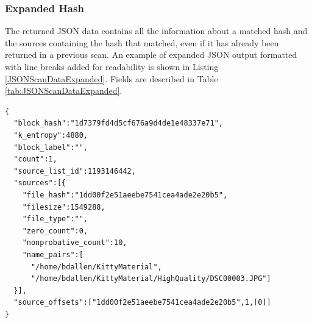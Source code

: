 \documentclass[11pt,fleqn]{article} %
\begin{document}
\subsubsection{Expanded Hash}
The returned JSON data contains all the information about a matched hash and the sources containing the hash that matched, even if it has already been returned in a previous scan. An example of expanded JSON output formatted with line breaks added for readability is shown in Listing \ref{JSONScanDataExpanded}. Fields are described in Table \ref{tab:JSONScanDataExpanded}.\\

\lstset{style=customfile}
\begin{lstlisting}[float, caption={Example JSON block hash expanded data output from a scan match, with line breaks added for readability}, label=JSONScanDataExpanded]
{
  "block_hash":"1d7379fd4d5cf676a9d4de1e48337e71",
  "k_entropy":4880,
  "block_label":"",
  "count":1,
  "source_list_id":1193146442,
  "sources":[{
    "file_hash":"1dd00f2e51aeebe7541cea4ade2e20b5",
    "filesize":1549288,
    "file_type":"",
    "zero_count":0,
    "nonprobative_count":10,
    "name_pairs":[
      "/home/bdallen/KittyMaterial",
      "/home/bdallen/KittyMaterial/HighQuality/DSC00003.JPG"]
  }],
  "source_offsets":["1dd00f2e51aeebe7541cea4ade2e20b5",1,[0]]
}
\end{lstlisting}
\end{document}
